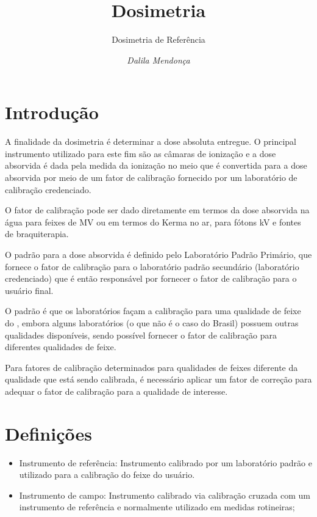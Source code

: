 \documentclass[11pt,a4paper]{article}
\title{Dosimetria}
\author{Dosimetria de Referência\nocite{*}}
\date{\textit{Dalila Mendonça}}
\begin{document}
	\maketitle

    \section{Introdução}

    A finalidade da dosimetria é determinar a dose absoluta entregue.  O principal instrumento utilizado para este fim são as câmaras de ionização e a dose absorvida é dada pela medida da ionização no meio que é convertida para a dose absorvida por meio de um fator de calibração fornecido por um laboratório de calibração credenciado.

    O fator de calibração pode ser dado diretamente em termos da dose absorvida na água para feixes de MV ou em termos do Kerma no ar, para fótons kV e fontes de braquiterapia.

    O padrão para a dose absorvida é definido pelo Laboratório Padrão Primário, que fornece o fator de calibração para o laboratório padrão secundário (laboratório credenciado) que é então responsável por fornecer o fator de calibração para o usuário final.

    O padrão é que os laboratórios façam a calibração para uma qualidade de feixe do , embora alguns laboratórios (o que não é o caso do Brasil) possuem outras qualidades disponíveis, sendo possível fornecer o fator de calibração para diferentes qualidades de feixe. 

    Para fatores de calibração determinados para qualidades de feixes diferente da qualidade que está sendo calibrada, é necessário aplicar um fator de correção para adequar o fator de calibração para a qualidade de interesse.

	\section{Definições}

  		\begin{itemize}
			\item \textcolor{CarnationPink}{Instrumento de referência}: Instrumento calibrado por um laboratório padrão e utilizado para a calibração do feixe do usuário.
			\item \textcolor{CarnationPink}{Instrumento de campo}: Instrumento calibrado via calibração cruzada com um instrumento de referência e normalmente utilizado em medidas rotineiras;
		\end{itemize}
\end{document}
